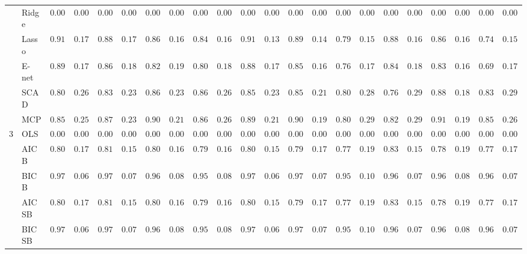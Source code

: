\begin{tabular}{p{0.2cm}p{1cm}|p{0.6cm}p{0.6cm}|p{0.6cm}p{0.6cm}p{0.6cm}p{0.6cm}p{0.6cm}p{0.6cm}|p{0.6cm}p{0.6cm}p{0.6cm}p{0.6cm}p{0.6cm}p{0.6cm}|p{0.6cm}p{0.6cm}p{0.6cm}p{0.6cm}p{0.6cm}p{0.6cm}}
 & Ridge  & $0.0000$ & $0.0000$ & $0.0000$ & $0.0000$ & $0.0000$ & $0.0000$ & $0.0000$ & $0.0000$ & $0.0000$ & $0.0000$ & $0.0000$ & $0.0000$ & $0.0000$ & $0.0000$ & $0.0000$ & $0.0000$ & $0.0000$ & $0.0000$ & $0.0000$ & $0.0000$ \\
 & Lasso  & $0.9167$ & $0.1733$ & $0.8833$ & $0.1716$ & $0.8683$ & $0.1612$ & $0.8433$ & $0.1689$ & $0.9167$ & $0.1391$ & $0.8983$ & $0.1496$ & $0.7983$ & $0.1594$ & $0.8883$ & $0.1608$ & $0.8600$ & $0.1653$ & $0.7433$ & $0.1579$ \\
 & E-net  & $0.8983$ & $0.1739$ & $0.8617$ & $0.1820$ & $0.8217$ & $0.1914$ & $0.8000$ & $0.1880$ & $0.8833$ & $0.1733$ & $0.8517$ & $0.1690$ & $0.7617$ & $0.1745$ & $0.8467$ & $0.1815$ & $0.8317$ & $0.1667$ & $0.6917$ & $0.1763$ \\
 & SCAD  & $0.8017$ & $0.2624$ & $0.8333$ & $0.2369$ & $0.8650$ & $0.2329$ & $0.8600$ & $0.2635$ & $0.8550$ & $0.2305$ & $0.8583$ & $0.2137$ & $0.8050$ & $0.2873$ & $0.7683$ & $0.2977$ & $0.8850$ & $0.1891$ & $0.8317$ & $0.2906$ \\
 & MCP  & $0.8567$ & $0.2518$ & $0.8700$ & $0.2388$ & $0.9033$ & $0.2121$ & $0.8650$ & $0.2635$ & $0.8933$ & $0.2165$ & $0.9050$ & $0.1943$ & $0.8067$ & $0.2956$ & $0.8217$ & $0.2933$ & $0.9100$ & $0.1901$ & $0.8533$ & $0.2609$ \\\hline
3 & OLS  & $0.0000$ & $0.0000$ & $0.0000$ & $0.0000$ & $0.0000$ & $0.0000$ & $0.0000$ & $0.0000$ & $0.0000$ & $0.0000$ & $0.0000$ & $0.0000$ & $0.0000$ & $0.0000$ & $0.0000$ & $0.0000$ & $0.0000$ & $0.0000$ & $0.0000$ & $0.0000$ \\
 & AIC B  & $0.8017$ & $0.1752$ & $0.8150$ & $0.1587$ & $0.8033$ & $0.1613$ & $0.7950$ & $0.1639$ & $0.8017$ & $0.1584$ & $0.7917$ & $0.1731$ & $0.7783$ & $0.1925$ & $0.8333$ & $0.1553$ & $0.7817$ & $0.1905$ & $0.7750$ & $0.1731$ \\
 & BIC B  & $0.9717$ & $0.0672$ & $0.9717$ & $0.0713$ & $0.9650$ & $0.0864$ & $0.9583$ & $0.0898$ & $0.9700$ & $0.0686$ & $0.9717$ & $0.0713$ & $0.9500$ & $0.1019$ & $0.9650$ & $0.0796$ & $0.9633$ & $0.0840$ & $0.9650$ & $0.0796$ \\
 & AIC SB  & $0.8017$ & $0.1752$ & $0.8150$ & $0.1587$ & $0.8033$ & $0.1613$ & $0.7950$ & $0.1639$ & $0.8017$ & $0.1584$ & $0.7917$ & $0.1731$ & $0.7783$ & $0.1925$ & $0.8333$ & $0.1553$ & $0.7817$ & $0.1905$ & $0.7750$ & $0.1731$ \\
 & BIC SB  & $0.9717$ & $0.0672$ & $0.9717$ & $0.0713$ & $0.9650$ & $0.0864$ & $0.9583$ & $0.0898$ & $0.9700$ & $0.0686$ & $0.9717$ & $0.0713$ & $0.9500$ & $0.1019$ & $0.9650$ & $0.0796$ & $0.9633$ & $0.0840$ & $0.9650$ & $0.0796$ \\

\end{tabular}
